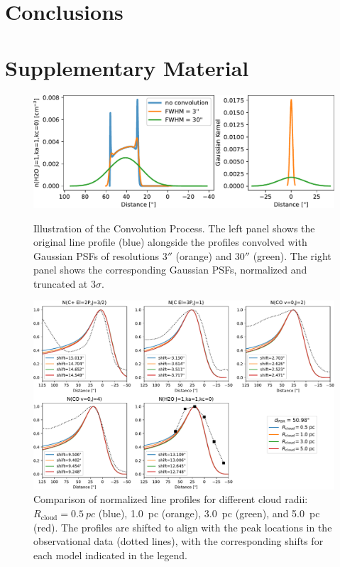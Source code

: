 \documentclass[12pt,a4paper]{article}
\newcommand{\mr}{\mathrm}
\begin{document}
\section{Conclusions} \label{sec:conclusion}


\clearpage
\printbibliography

\clearpage
\appendix
\section*{Supplementary Material}

\begin{figure}[h]
    \centering
    \includegraphics[width=.88\textwidth,keepaspectratio]{convolution_nosurfchem.pdf}
    \caption{Illustration of the Convolution Process. The left panel shows the original line profile (blue) alongside the profiles convolved with Gaussian PSFs of resolutions $3''$ (orange) and $30''$ (green). The right panel shows the corresponding Gaussian PSFs, normalized and truncated at $3\sigma$.} \label{fig:convolution_nosurfchem}

    \vspace{2em}

    \includegraphics[width=\textwidth,keepaspectratio]{comp_curvature_obs_shape.pdf}
    \caption{Comparison of normalized line profiles for different cloud radii: $R_\mr{cloud} = \qty{0.5}{pc}$ (blue), \qty{1.0}{pc} (orange), \qty{3.0}{pc} (green), and \qty{5.0}{pc} (red). The profiles are shifted to align with the peak locations in the observational data (dotted lines), with the corresponding shifts for each model indicated in the legend.} \label{fig:comprad_shape}
\end{figure}
\end{document}
